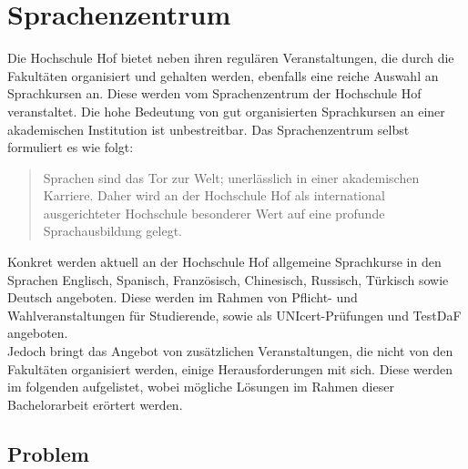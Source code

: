 \section{Sprachenzentrum\label{sec:anforderungen_sz}}

Die Hochschule Hof bietet neben ihren regulären Veranstaltungen, die durch die Fakultäten organisiert und gehalten werden, ebenfalls eine reiche Auswahl an Sprachkursen an. Diese werden vom Sprachenzentrum der Hochschule Hof veranstaltet. Die hohe Bedeutung von gut organisierten Sprachkursen an einer akademischen Institution ist unbestreitbar. Das Sprachenzentrum selbst formuliert es wie folgt:
\begin{quote}
Sprachen sind das Tor zur Welt; unerlässlich in einer akademischen Karriere. Daher wird an der Hochschule Hof als international ausgerichteter Hochschule besonderer Wert auf eine profunde Sprachausbildung gelegt.
\autocite[][]{szweb}
\end{quote}
Konkret werden aktuell an der Hochschule Hof allgemeine Sprachkurse in den Sprachen Englisch, Spanisch, Französisch, Chinesisch, Russisch, Türkisch sowie Deutsch angeboten. Diese werden im Rahmen von Pflicht- und Wahlveranstaltungen für Studierende, sowie als \ac{UNIcert}-Prüfungen und \ac{TestDaF} angeboten.
\\
\linebreak
Jedoch bringt das Angebot von zusätzlichen Veranstaltungen, die nicht von den Fakultäten organisiert werden, einige Herausforderungen mit sich. Diese werden im folgenden aufgelistet, wobei mögliche Lösungen im Rahmen dieser Bachelorarbeit erörtert werden.

\subsection{Problem\label{sec:prob_sz}}

